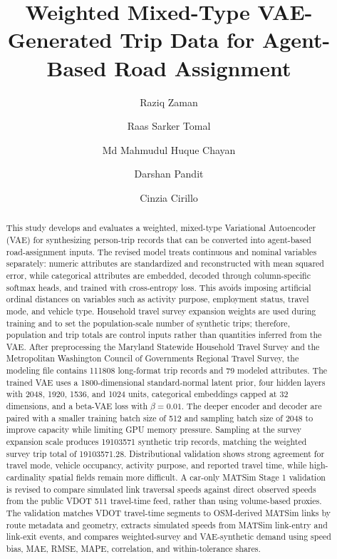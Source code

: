 \documentclass[3p,times,procedia]{elsarticle}
\begin{document}
\begin{frontmatter}


\title{Weighted Mixed-Type VAE-Generated Trip Data for Agent-Based Road Assignment}

\author[a]{Raziq Zaman}
\author[a]{Raas Sarker Tomal}
\author[a]{Md Mahmudul Huque Chayan}
\author[a]{Darshan Pandit}
\author[a]{Cinzia Cirillo}

\address[a]{Department of Civil and Environmental Engineering, University of Maryland}

\begin{abstract}
This study develops and evaluates a weighted, mixed-type Variational Autoencoder (VAE) for synthesizing person-trip records that can be converted into agent-based road-assignment inputs. The revised model treats continuous and nominal variables separately: numeric attributes are standardized and reconstructed with mean squared error, while categorical attributes are embedded, decoded through column-specific softmax heads, and trained with cross-entropy loss. This avoids imposing artificial ordinal distances on variables such as activity purpose, employment status, travel mode, and vehicle type. Household travel survey expansion weights are used during training and to set the population-scale number of synthetic trips; therefore, population and trip totals are control inputs rather than quantities inferred from the VAE. After preprocessing the Maryland Statewide Household Travel Survey and the Metropolitan Washington Council of Governments Regional Travel Survey, the modeling file contains \num{111808} long-format trip records and 79 modeled attributes. The trained VAE uses a 1800-dimensional standard-normal latent prior, four hidden layers with 2048, 1920, 1536, and 1024 units, categorical embeddings capped at 32 dimensions, and a beta-VAE loss with $\beta=0.01$. The deeper encoder and decoder are paired with a smaller training batch size of 512 and sampling batch size of 2048 to improve capacity while limiting GPU memory pressure. Sampling at the survey expansion scale produces \num{19103571} synthetic trip records, matching the weighted survey trip total of \num{19103571.28}. Distributional validation shows strong agreement for travel mode, vehicle occupancy, activity purpose, and reported travel time, while high-cardinality spatial fields remain more difficult. A car-only MATSim Stage 1 validation is revised to compare simulated link traversal speeds against direct observed speeds from the public VDOT 511 travel-time feed, rather than using volume-based proxies. The validation matches VDOT travel-time segments to OSM-derived MATSim links by route metadata and geometry, extracts simulated speeds from MATSim link-entry and link-exit events, and compares weighted-survey and VAE-synthetic demand using speed bias, MAE, RMSE, MAPE, correlation, and within-tolerance shares.
\end{abstract}


\end{frontmatter}
\end{document}
